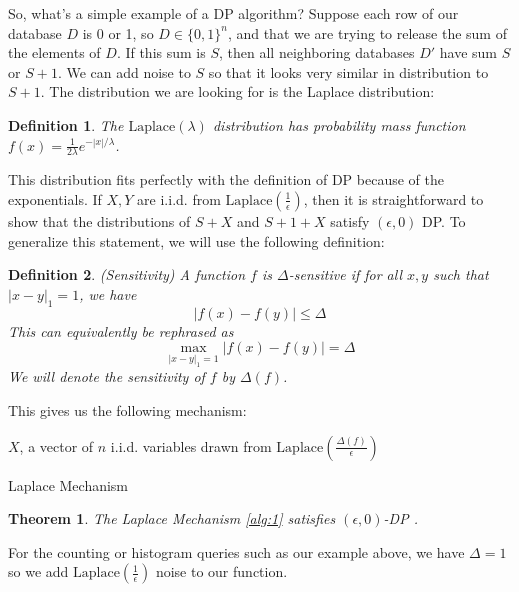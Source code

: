 \documentclass[11pt]{article}
\newtheorem{theorem}{Theorem}
\newtheorem{defn}{Definition}
\begin{document}
So, what's a simple example of a DP algorithm? Suppose each row of our database $D$ is 0 or 1, so $D \in \{0, 1\}^n$, and that we are trying to release the sum of the elements of $D$. If this sum is $S$, then all neighboring databases $D'$ have sum $S$ or $S+1$. We can add noise to $S$ so that it looks very similar in distribution to $S+1$. The distribution we are looking for is the Laplace distribution:
\begin{defn}
The $\text{Laplace}(\lambda)$ distribution has probability mass function $f(x) = \frac{1}{2\lambda}e^{-|x|/\lambda}$.
\end{defn}
This distribution fits perfectly with the definition of DP because of the exponentials. If $X,Y$ are i.i.d. from $\text{Laplace}\left(\frac{1}{\epsilon}\right)$, then it is straightforward to show that the distributions of $S+X$ and $S+1+X$ satisfy $(\epsilon, 0)$ DP. To generalize this statement, we will use the following definition:
\begin{defn}
(Sensitivity) A function $f$ is $\Delta$-sensitive if for all $x,y$ such that $|x-y|_1 = 1$, we have 
\[
|f(x) - f(y)| \leq \Delta
\]
This can equivalently be rephrased as 
\[
\max_{|x-y|_1=1}|f(x) - f(y)| = \Delta
\]
We will denote the sensitivity of $f$ by $\Delta(f)$.
\end{defn}
This gives us the following mechanism:

\begin{algorithm}\label{alg:1}
\SetAlgoLined
{}
$X$, a vector of $n$ i.i.d. variables drawn from $\text{Laplace}\left(\frac{\Delta(f)}{\epsilon}\right)$\;
\caption{Laplace Mechanism}
\end{algorithm}

\begin{theorem}
The Laplace Mechanism \ref{alg:1} satisfies $(\epsilon, 0)$-DP \cite{Dwork:2006}.
\end{theorem}
For the counting or histogram queries such as our example above, we have $\Delta = 1$ so we add $\text{Laplace}\left(\frac{1}{\epsilon}\right)$ noise to our function.
\end{document}

